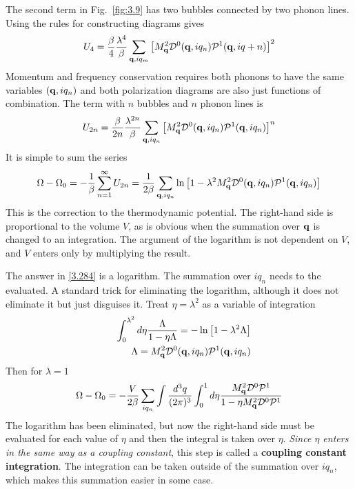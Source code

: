 The second term in Fig.~\ref{fig:3.9} has two bubbles connected by two phonon lines. Using the rules for constructing diagrams gives
\begin{equation}
    U_4 = \frac{\beta}{4} \frac{\lambda^4}{\beta} \sum_{\mathbf{q},iq_m} \left[ M_{\mathbf{q}}^2 \mathcal{D}^0(\mathbf{q},iq_n) \mathcal{P}^1(\mathbf{q},iq+n) \right]^2  \label{3.282}
\end{equation}
Momentum and frequency conservation requires both phonons to have the same variables $(\mathbf{q},iq_n)$ and both polarization diagrams are also just functions of combination.
The term with $n$ bubbles and $n$ phonon lines is
\begin{equation}
    U_{2n} = \frac{\beta}{2n} \frac{\lambda^{2n}}{\beta} \sum_{\mathbf{q},iq_n} \left[ M^2_{\mathbf{q}} \mathcal{D}^0(\mathbf{q},iq_n) \mathcal{P}^1(\mathbf{q},iq_n) \right]^n   \label{3.283}
\end{equation}
It is simple to sum the series
\begin{equation}
    \Omega - \Omega_0 = - \frac{1}{\beta} \sum_{n=1}^\infty U_{2n} = \frac{1}{2\beta} \sum_{\mathbf{q},iq_n} \ln \left[ 1-\lambda^2 M^2_{\mathbf{q}} \mathcal{D}^0(\mathbf{q},iq_n) \mathcal{P}^1(\mathbf{q},iq_n)  \right]        \label{3.284}
\end{equation}
This is the correction to the thermodynamic potential.
The right-hand side is proportional to the volume $V$, as is obvious when the summation over $\mathbf{q}$ is changed to an integration.
The argument of the logarithm is not dependent on $V$, and $V$ enters only by multiplying the result.

The answer in \eqref{3.284} is a logarithm.
The summation over $iq_n$ needs to the evaluated.
A standard trick for eliminating the logarithm, although it does not eliminate it but just disguises it.
Treat $\eta = \lambda^2$ as a variable of integration
\begin{eqnarray}
    &&\int_0^{\lambda^2} d\eta \frac{\Lambda}{1 - \eta\Lambda} = -\ln \left[1 -\lambda^2 \Lambda \right] \label{3.286} \\
    && \Lambda = M^2_{\mathbf{q}} \mathcal{D}^0(\mathbf{q},iq_n) \mathcal{P}^1(\mathbf{q},iq_n) \label{3.287}
\end{eqnarray}
Then for $\lambda =1$
\begin{equation}
    \Omega- \Omega_0 = - \frac{V}{2\beta} \sum_{iq_n} \int \frac{d^3 q}{(2\pi)^3} \int_0^1 d\eta \frac{M_{\mathbf{q}}^2 \mathcal{D}^0 \mathcal{P}^1}{1 - \eta M^2_{\mathbf{q}} \mathcal{D}^0 \mathcal{P}^1} \label{3.288}
\end{equation}
The logarithm has been eliminated, but now the right-hand side must be evaluated for each value of $\eta$ and then the integral is taken over $\eta$.
\textit{Since $\eta$ enters in the same way as a coupling constant}, this step is called a \textbf{coupling constant integration}.
The integration can be taken outside of the summation over $iq_n$, which makes this summation easier in some case.

